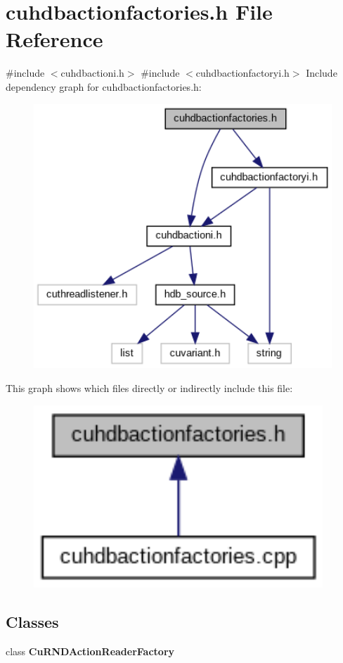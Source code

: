 \section{cuhdbactionfactories.\+h File Reference}
\label{cuhdbactionfactories_8h}
{\ttfamily \#include $<$cuhdbactioni.\+h$>$}\newline
{\ttfamily \#include $<$cuhdbactionfactoryi.\+h$>$}\newline
Include dependency graph for cuhdbactionfactories.\+h\+:
\nopagebreak
\begin{figure}[H]
\begin{center}
\leavevmode
\includegraphics[width=350pt]{cuhdbactionfactories_8h__incl}
\end{center}
\end{figure}
This graph shows which files directly or indirectly include this file\+:
\nopagebreak
\begin{figure}[H]
\begin{center}
\leavevmode
\includegraphics[width=308pt]{cuhdbactionfactories_8h__dep__incl}
\end{center}
\end{figure}
\subsection*{Classes}
\begin{DoxyCompactItemize}
\item 
class \textbf{ Cu\+R\+N\+D\+Action\+Reader\+Factory}
\end{DoxyCompactItemize}
